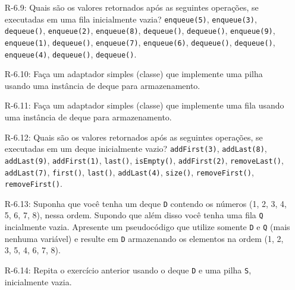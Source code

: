 \begin{enumerate}
\begin{itemize}
		\item[R-6.9:] Quais são os valores retornados após as seguintes operações, se executadas em uma fila inicialmente vazia? \texttt{enqueue(5)}, \texttt{enqueue(3)}, \texttt{dequeue()}, \texttt{enqueue(2)}, \texttt{enqueue(8)}, \texttt{dequeue()}, \texttt{dequeue()}, \texttt{enqueue(9)}, \texttt{enqueue(1)}, \texttt{dequeue()}, \texttt{enqueue(7)}, \texttt{enqueue(6)}, \texttt{dequeue()}, \texttt{dequeue()}, \texttt{enqueue(4)}, \texttt{dequeue()}, \texttt{dequeue()}.
		
		\item[R-6.10:] Faça um adaptador simples (classe) que implemente uma pilha usando uma instância de deque para armazenamento.
		
		\item[R-6.11:] Faça um adaptador simples (classe) que implemente uma fila usando uma instância de deque para armazenamento.
		
		\item[R-6.12:] Quais são os valores retornados após as seguintes operações, se executadas em um deque inicialmente vazio? \texttt{addFirst(3)}, \texttt{addLast(8)}, \texttt{addLast(9)}, \texttt{addFirst(1)}, \texttt{last()}, \texttt{isEmpty()}, \texttt{addFirst(2)}, \texttt{removeLast()}, \texttt{addLast(7)}, \texttt{first()}, \texttt{last()}, \texttt{addLast(4)}, \texttt{size()}, \texttt{removeFirst()}, \texttt{removeFirst()}.
		
		\item[R-6.13:] Suponha que você tenha um deque \texttt{D} contendo os números (1, 2, 3, 4, 5, 6, 7, 8), nessa ordem. Supondo que além disso você tenha uma fila \texttt{Q} incialmente vazia. Apresente um pseudocódigo que utilize somente \texttt{D} e \texttt{Q} (mais nenhuma variável) e resulte em \texttt{D} armazenando os elementos na ordem (1, 2, 3, 5, 4, 6, 7, 8).
		
		\item[R-6.14:] Repita o exercício anterior usando o deque \texttt{D} e uma pilha \texttt{S}, inicialmente vazia.
	\end{itemize}
\end{enumerate}

\clearpage
\medskip

\begingroup
	\footnotesize
	\renewcommand{\chapter}[2]{}%
	
	
\endgroup

